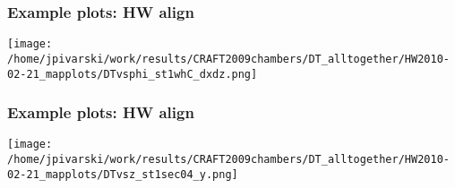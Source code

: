 \documentclass[compress]{beamer}
\begin{document}
\begin{frame}
\frametitle{Example plots: HW align}
\texttt{[image: /home/jpivarski/work/results/CRAFT2009chambers/DT\_alltogether/HW2010-02-21\_mapplots/DTvsphi\_st1whC\_dxdz.png]}
\end{frame}


\begin{frame}
\frametitle{Example plots: HW align}
\texttt{[image: /home/jpivarski/work/results/CRAFT2009chambers/DT\_alltogether/HW2010-02-21\_mapplots/DTvsz\_st1sec04\_y.png]}
\label{numpages}
\end{frame}
\end{document}
